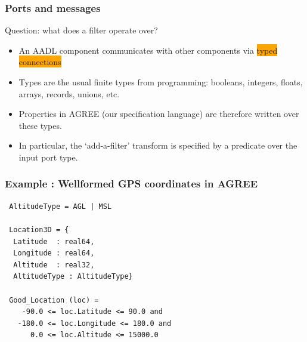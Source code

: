 \documentclass{beamer}
\newcommand{\kemph}[1]{\colorbox{orange}{#1}}
\begin{document}
\begin{frame}\frametitle{Ports and messages}

Question: what does a filter operate over?

\begin{itemize}

  \item An AADL component communicates with other components via \kemph{typed connections}

\item  Types are the usual finite types from programming: booleans,
  integers, floats, arrays, records, unions, etc.

\item Properties in AGREE (our specification language) are therefore
  written over these types.

\item In particular, the `add-a-filter' transform is specified by a predicate over the input port type.

\end{itemize}

\end{frame}

\begin{frame}[fragile]\frametitle{Example : Wellformed GPS coordinates in AGREE}

{\small
\begin{verbatim}
 AltitudeType = AGL | MSL

 Location3D = {
  Latitude  : real64,
  Longitude : real64,
  Altitude  : real32,
  AltitudeType : AltitudeType}

 Good_Location (loc) =
    -90.0 <= loc.Latitude <= 90.0 and
   -180.0 <= loc.Longitude <= 180.0 and
      0.0 <= loc.Altitude <= 15000.0
\end{verbatim}
}

\end{frame}
\end{document}
